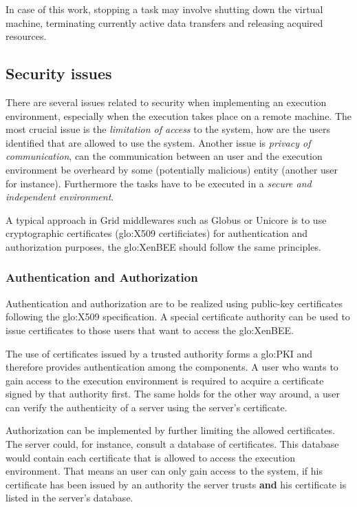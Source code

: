 In  case of  this work,  stopping  a task  may involve  shutting down  the
virtual machine, terminating currently active data transfers and releasing
acquired resources.

\subsection{Security issues}

There  are  several  issues  related  to  security  when  implementing  an
execution  environment, especially  when the  execution takes  place  on a
remote machine. The most crucial  issue is the \emph{limitation of access}
to the system,  \ie how are the users identified that  are allowed to use
the system.   Another issue  is \emph{privacy of  communication}, \ie can
the  communication  between  an  user  and the  execution  environment  be
overheard  by  some  (potentially  malicious)  entity  (another  user  for
instance).  Furthermore  the tasks have  to be executed in  a \emph{secure
  and independent environment}.

A typical  approach in  Grid middlewares such  as Globus  \cite{globus} or
Unicore    \cite{unicore}   is    to   use    cryptographic   certificates
(\eg \gls{glo:X509}  certificiates) for authentication  and authorization
purposes, the \gls{glo:XenBEE} should follow the same principles.

\subsubsection{Authentication and Authorization}

Authentication  and  authorization are  to  be  realized using  public-key
certificates  following  the   \gls{glo:X509}  specification.   A  special
certificate authority  can be  used to issue  certificates to  those users
that want to access the \gls{glo:XenBEE}.

The  use   of  certificates  issued   by  a  trusted  authority   forms  a
\gls{glo:PKI}   and   therefore    provides   authentication   among   the
components. A user  who wants to gain access  to the execution environment
is required to  acquire a certificate signed by  that authority first. The
same holds for the other way around, a user can verify the authenticity of
a server using the server's certificate.

Authorization  can   be  implemented  by  further   limiting  the  allowed
certificates.   The server  could,  for instance,  consult  a database  of
certificates. This database would contain each certificate that is allowed
to  access the execution  environment. That  means an  user can  only gain
access to the  system, if his certificate has been  issued by an authority
the server trusts  \textbf{and} his certificate is listed  in the server's
database.

